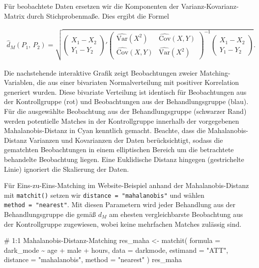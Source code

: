 \documentclass[
  a4paper,
  DIV=11,
  oneside]{scrreprt}
\newenvironment{Shaded}{\begin{snugshade}}{\end{snugshade}}
\newcommand{\AttributeTok}[1]{\textcolor[rgb]{0.40,0.45,0.13}{#1}}
\newcommand{\CommentTok}[1]{\textcolor[rgb]{0.37,0.37,0.37}{#1}}
\newcommand{\FunctionTok}[1]{\textcolor[rgb]{0.28,0.35,0.67}{#1}}
\newcommand{\NormalTok}[1]{\textcolor[rgb]{0.00,0.23,0.31}{#1}}
\newcommand{\OtherTok}[1]{\textcolor[rgb]{0.00,0.23,0.31}{#1}}
\newcommand{\SpecialCharTok}[1]{\textcolor[rgb]{0.37,0.37,0.37}{#1}}
\newcommand{\StringTok}[1]{\textcolor[rgb]{0.13,0.47,0.30}{#1}}
\begin{document}
Für beobachtete Daten ersetzen wir die Komponenten der
Varianz-Kovarianz-Matrix durch Stichprobenmaße. Dies ergibt die Formel

\begin{align*}
  \widehat{d}_M(P_1,\,P_2) = \sqrt{
  \begin{pmatrix}
    X_1 - X_2\\
    Y_1 - Y_2
  \end{pmatrix}'
  \begin{pmatrix}
    \widehat{\text{Var}}(X^2) & \widehat{\text{Cov}}(X, Y) \\
     \widehat{\text{Cov}}(X, Y) & \widehat{\text{Var}}(X^2) 
  \end{pmatrix}^{-1}
    \begin{pmatrix}
    X_1 - X_2\\
    Y_1 - Y_2
  \end{pmatrix}
}.
\end{align*}

Die nachstehende interaktive Grafik zeigt Beobachtungen zweier
Matching-Variablen, die aus einer bivariaten Normalverteilung mit
positiver Korrelation generiert wurden. Diese bivariate Verteilung ist
identisch für Beobachtungen aus der Kontrollgruppe (rot) und
Beobachtungen aus der Behandlungsgruppe (blau). Für die ausgewählte
Beobachtung aus der Behandlungsgruppe (schwarzer Rand) werden
potentielle Matches in der Kontrollgruppe innerhalb der vorgegebenen
Mahalanobis-Distanz in Cyan kenntlich gemacht. Beachte, dass die
Mahalanobis-Distanz Varianzen und Kovarianzen der Daten berücksichtigt,
sodass die gematchten Beobachtungen in einem elliptischen Bereich um die
betrachtete behandelte Beobachtung liegen. Eine Euklidische Distanz
hingegen (gestrichelte Linie) ignoriert die Skalierung der Daten.

Für Eins-zu-Eins-Matching im Website-Beispiel anhand der
Mahalanobis-Distanz mit \texttt{matchit()} setzen wir
\texttt{distance\ =\ "mahalanobis"} und wählen
\texttt{method\ =\ "nearest"}. Mit diesen Parametern wird jeder
Behandlung aus der Behandlungsgruppe die gemäß \(d_M\) am ehesten
vergleichbarste Beobachtung aus der Kontrollgruppe zugewiesen, wobei
keine mehrfachen Matches zulässig sind.

\begin{Shaded}
\begin{Highlighting}[]
\CommentTok{\# 1:1 Mahalanobis{-}Distanz{-}Matching}
\NormalTok{res\_maha }\OtherTok{\textless{}{-}} \FunctionTok{matchit}\NormalTok{(}
  \AttributeTok{formula =}\NormalTok{ dark\_mode }\SpecialCharTok{\textasciitilde{}}\NormalTok{ age }\SpecialCharTok{+}\NormalTok{ male }\SpecialCharTok{+}\NormalTok{ hours, }
  \AttributeTok{data =}\NormalTok{ darkmode, }
  \AttributeTok{estimand =} \StringTok{"ATT"}\NormalTok{,}
  \AttributeTok{distance =} \StringTok{"mahalanobis"}\NormalTok{, }
  \AttributeTok{method =} \StringTok{"nearest"}
\NormalTok{)}
\NormalTok{res\_maha}
\end{Highlighting}
\end{Shaded}
\end{document}
